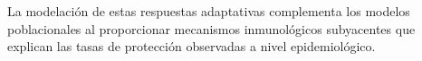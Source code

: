 La modelación de estas respuestas adaptativas complementa los modelos poblacionales al proporcionar mecanismos inmunológicos subyacentes que explican las tasas de protección observadas a nivel epidemiológico.







